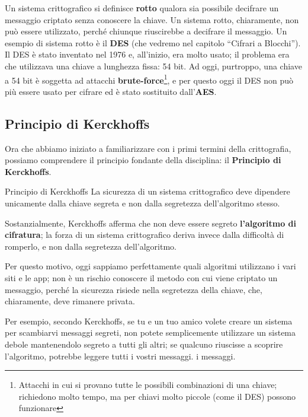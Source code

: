 \documentclass{rapport}
\begin{document}
Un sistema crittografico si definisce \textbf{rotto} qualora sia possibile decifrare un messaggio criptato senza conoscere la chiave. Un sistema rotto, chiaramente, non può essere utilizzato, perché chiunque riuscirebbe a decifrare il messaggio. Un esempio di sistema rotto è il \textbf{DES} (che vedremo nel capitolo “Cifrari a Blocchi”). Il DES è stato inventato nel 1976 e, all’inizio, era molto usato; il problema era che utilizzava una chiave a lunghezza fissa: 54 bit. Ad oggi, purtroppo, una chiave a 54 bit è soggetta ad attacchi \textbf{brute-force}\footnote{Attacchi in cui si provano tutte le possibili combinazioni di una chiave; richiedono molto tempo, ma per chiavi molto piccole (come il DES) possono funzionare}, e per questo oggi il DES non può più essere usato per cifrare ed è stato sostituito dall’\textbf{AES}.


\newpage





\subsection{Principio di Kerckhoffs}

Ora che abbiamo iniziato a familiarizzare con i primi termini della crittografia, possiamo comprendere il principio fondante della disciplina: il \textbf{Principio di Kerckhoffs}.


\begin{teorema}{Principio di Kerckhoffs}{}
La sicurezza di un sistema crittografico deve dipendere unicamente dalla chiave segreta e non dalla segretezza dell’algoritmo stesso.

\end{teorema}

Sostanzialmente, Kerckhoffs afferma che non deve essere segreto \textbf{l’algoritmo di cifratura}; la forza di un sistema crittografico deriva invece dalla difficoltà di romperlo, e non dalla segretezza dell’algoritmo.


Per questo motivo, oggi sappiamo perfettamente quali algoritmi utilizzano i vari siti e le app; non è un rischio conoscere il metodo con cui viene criptato un messaggio, perché la sicurezza risiede nella segretezza della chiave, che, chiaramente, deve rimanere privata. 


Per esempio, secondo Kerckhoffs, se tu e un tuo amico volete creare un sistema per scambiarvi messaggi segreti, non potete semplicemente utilizzare un sistema debole mantenendolo segreto a tutti gli altri; se qualcuno riuscisse a scoprire l’algoritmo, potrebbe leggere tutti i vostri messaggi. i messaggi.
\end{document}
